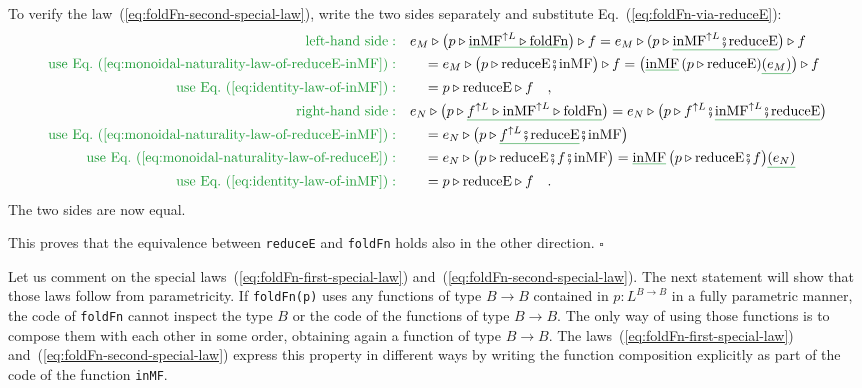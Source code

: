 To verify the law~(\ref{eq:foldFn-second-special-law}), write the
two sides separately and substitute Eq.~(\ref{eq:foldFn-via-reduceE}):
\begin{align*}
{\color{greenunder}\text{left-hand side}:}\quad & e_{M}\triangleright\big(p\triangleright\gunderline{\text{inMF}^{\uparrow L}\triangleright\text{foldFn}}\big)\triangleright f=e_{M}\triangleright(p\triangleright\gunderline{\text{inMF}^{\uparrow L}\bef\text{reduceE}}\big)\triangleright f\\
{\color{greenunder}\text{use Eq.~(\ref{eq:monoidal-naturality-law-of-reduceE-inMF})}:}\quad & \quad=e_{M}\triangleright\big(p\triangleright\text{reduceE}\bef\text{inMF}\big)\triangleright f=\big(\gunderline{\text{inMF}}\,(p\triangleright\text{reduceE})\gunderline{(e_{M})}\big)\triangleright f\\
{\color{greenunder}\text{use Eq.~(\ref{eq:identity-law-of-inMF})}:}\quad & \quad=p\triangleright\text{reduceE}\triangleright f\quad,\\
{\color{greenunder}\text{right-hand side}:}\quad & e_{N}\triangleright\big(p\triangleright\gunderline{f^{\uparrow L}\triangleright\text{inMF}^{\uparrow L}\triangleright\text{foldFn}}\big)=e_{N}\triangleright\big(p\triangleright f^{\uparrow L}\bef\gunderline{\text{inMF}^{\uparrow L}\bef\text{reduceE}}\big)\\
{\color{greenunder}\text{use Eq.~(\ref{eq:monoidal-naturality-law-of-reduceE-inMF})}:}\quad & \quad=e_{N}\triangleright\big(p\triangleright\gunderline{f^{\uparrow L}\bef\text{reduceE}}\bef\text{inMF}\big)\\
{\color{greenunder}\text{use Eq.~(\ref{eq:monoidal-naturality-law-of-reduceE})}:}\quad & \quad=e_{N}\triangleright\big(p\triangleright\text{reduceE}\bef f\bef\text{inMF}\big)=\gunderline{\text{inMF}}\,\big(p\triangleright\text{reduceE}\bef f\big)\gunderline{(e_{N})}\\
{\color{greenunder}\text{use Eq.~(\ref{eq:identity-law-of-inMF})}:}\quad & \quad=p\triangleright\text{reduceE}\triangleright f\quad.
\end{align*}
The two sides are now equal.

This proves that the equivalence between \lstinline!reduceE! and
\lstinline!foldFn! holds also in the other direction. $\square$

Let us comment on the special laws~(\ref{eq:foldFn-first-special-law})
and~(\ref{eq:foldFn-second-special-law}). The next statement will
show that those laws follow from parametricity. If \lstinline!foldFn(p)!
uses any functions of type $B\rightarrow B$ contained in $p:L^{B\rightarrow B}$
in a fully parametric manner, the code of \lstinline!foldFn! cannot
inspect the type $B$ or the code of the functions of type $B\rightarrow B$.
The only way of using those functions is to compose them with each
other in some order, obtaining again a function of type $B\rightarrow B$.
The laws~(\ref{eq:foldFn-first-special-law}) and~(\ref{eq:foldFn-second-special-law})
express this property in different ways by writing the function composition
explicitly as part of the code of the function \lstinline!inMF!.

